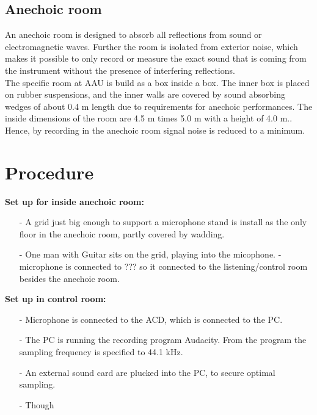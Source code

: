 \subsection{Anechoic room} 
An anechoic room is designed to absorb all reflections from sound or electromagnetic waves. Further the room is isolated from exterior noise, which makes it possible to only record or measure the exact sound that is coming from the instrument without the presence of interfering reflections. \\ The specific room at AAU is build as a box inside a box. The inner box is placed on rubber suspensions, and the inner walls are covered by sound absorbing wedges of about 0.4 m length due to requirements for anechoic performances. The inside dimensions of the room are 4.5 m times 5.0 m with a height of 4.0 m.\cite{anechoic}.\\
Hence, by recording in the anechoic room signal noise is reduced to a minimum.

\section{Procedure}
\textbf{Set up for inside anechoic room:}\\
\begin{itemize}
\item[-] A grid just big enough to support a microphone stand is install as the only floor in the anechoic room, partly covered by wadding. 
\item[-] One man with Guitar sits on the grid, playing into the micophone. 
- microphone is connected to ???  so it connected to the listening/control room besides the anechoic room. 
\end{itemize}   
\textbf{Set up in control room: }
\begin{itemize}
\item[-] Microphone is connected to the ACD, which is connected to the PC.
\item[-] The PC is running the recording program Audacity. From the program the sampling frequency is specified to 44.1 kHz.
\item[-] An external sound card are plucked into the PC, to secure optimal sampling.  
\item[-] Though      
\end{itemize}


